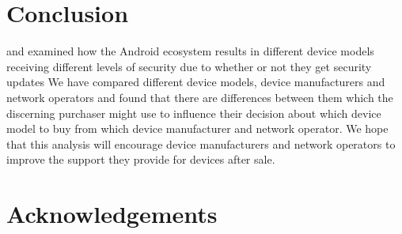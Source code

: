 \documentclass{sig-alternate}
\newcommand{\identifying}[1]{#1}%
\begin{document}
\section{Conclusion}
 and examined how the Android ecosystem results in different device models receiving different levels of security due to whether or not they get security updates
We have compared different device models, device manufacturers and network operators and found that there are differences between them which the discerning purchaser might use to influence their decision about which device model to buy from which device manufacturer and network operator.
We hope that this analysis will encourage device manufacturers and network operators to improve the support they provide for devices after sale.

\identifying{
\section*{Acknowledgements}
}

\printbibliography
\end{document}
